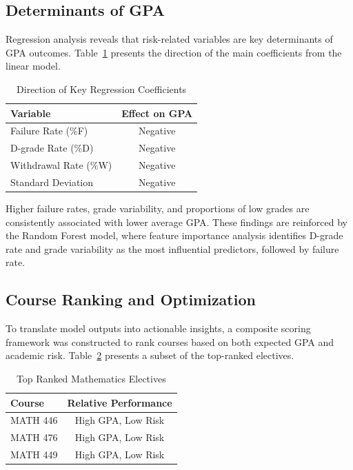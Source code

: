 \documentclass[a4paper,12pt,reqno]{amsart}
\numberwithin{equation}{section}
\theoremstyle{plain}
\theoremstyle{definition}
\begin{document}
\subsection{Determinants of GPA}

Regression analysis reveals that risk-related variables are key determinants of GPA outcomes. Table~\ref{tab:coefficients} presents the direction of the main coefficients from the linear model.

\begin{table}[H]
\centering
\caption{Direction of Key Regression Coefficients}
\label{tab:coefficients}
\begin{tabular}{lc}
\hline
Variable & Effect on GPA \\
\hline
Failure Rate (\%F) & Negative \\
D-grade Rate (\%D) & Negative \\
Withdrawal Rate (\%W) & Negative \\
Standard Deviation & Negative \\
\hline
\end{tabular}
\end{table}

Higher failure rates, grade variability, and proportions of low grades are consistently associated with lower average GPA. These findings are reinforced by the Random Forest model, where feature importance analysis identifies D-grade rate and grade variability as the most influential predictors, followed by failure rate.

\subsection{Course Ranking and Optimization}

To translate model outputs into actionable insights, a composite scoring framework was constructed to rank courses based on both expected GPA and academic risk. Table~\ref{tab:ranking} presents a subset of the top-ranked electives.

\begin{table}[H]
\centering
\caption{Top Ranked Mathematics Electives}
\label{tab:ranking}
\begin{tabular}{lc}
\hline
Course & Relative Performance \\
\hline
MATH 446 & High GPA, Low Risk \\
MATH 476 & High GPA, Low Risk \\
MATH 449 & High GPA, Low Risk \\
\hline
\end{tabular}
\end{table}
\end{document}
